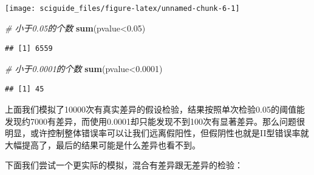 \documentclass[]{tufte-book}
\newenvironment{Shaded}{}{}
\newcommand{\CommentTok}[1]{\textcolor[rgb]{0.38,0.63,0.69}{\textit{#1}}}
\newcommand{\ControlFlowTok}[1]{\textcolor[rgb]{0.00,0.44,0.13}{\textbf{#1}}}
\newcommand{\DecValTok}[1]{\textcolor[rgb]{0.25,0.63,0.44}{#1}}
\newcommand{\FloatTok}[1]{\textcolor[rgb]{0.25,0.63,0.44}{#1}}
\newcommand{\KeywordTok}[1]{\textcolor[rgb]{0.00,0.44,0.13}{\textbf{#1}}}
\newcommand{\NormalTok}[1]{#1}
\newcommand{\OperatorTok}[1]{\textcolor[rgb]{0.40,0.40,0.40}{#1}}
\newcommand{\OtherTok}[1]{\textcolor[rgb]{0.00,0.44,0.13}{#1}}
\newcommand{\StringTok}[1]{\textcolor[rgb]{0.25,0.44,0.63}{#1}}
\begin{document}
\texttt{[image: sciguide\_files/figure-latex/unnamed-chunk-6-1]}

\begin{Shaded}
\begin{Highlighting}[]
\CommentTok{# 小于0.05的个数}
\KeywordTok{sum}\NormalTok{(pvalue}\OperatorTok{<}\FloatTok{0.05}\NormalTok{)}
\end{Highlighting}
\end{Shaded}

\begin{verbatim}
## [1] 6559
\end{verbatim}

\begin{Shaded}
\begin{Highlighting}[]
\CommentTok{# 小于0.0001的个数}
\KeywordTok{sum}\NormalTok{(pvalue}\OperatorTok{<}\FloatTok{0.0001}\NormalTok{)}
\end{Highlighting}
\end{Shaded}

\begin{verbatim}
## [1] 45
\end{verbatim}

上面我们模拟了10000次有真实差异的假设检验，结果按照单次检验0.05的阈值能发现约7000有差异，而使用0.0001却只能发现不到100次有显著差异。那么问题很明显，或许控制整体错误率可以让我们远离假阳性，但假阴性也就是II型错误率就大幅提高了，最后的结果可能是什么差异也看不到。

下面我们尝试一个更实际的模拟，混合有差异跟无差异的检验：

\begin{Shaded}
\end{Shaded}
\end{document}

